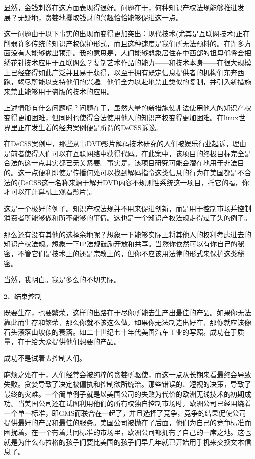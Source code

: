 显然，金钱刺激在这方面表现得很好。问题在于，何种知识产权法规能够推进发展？无疑地，贪婪地攫取钱财的兴趣恰恰能够促进这一点。

这一问题由于以下事实的出现而变得更加突出：现代技术(尤其是互联网技术)正在削弱许多传统的知识产权保护形式，而且这种速度是我们所无法预料的。在许多方面没有人能够做出预测。我的意思是，人们能够想象居住在中西部的祖母们将会把绣花针技术应用于互联网么？复制艺术作品的能力——和技术本身——在很大规模上已经变得如此广泛并且易于获得，以至于拥有既定信息提供者的机构们东奔西跑，竭尽所能以支持他们的兴趣。他们全力以赴地禁止类似的复制，并引入新措施来禁止能够用于盗版的技术的应用。

上述情形有什么问题呢？问题在于，虽然大量的新措施使非法使用他人的知识产权变得更加困难，但同时也使得合法使用他人的知识产权变得更加困难。在linux世界里正在发生着的经典案例便是所谓的DeCSS诉讼。

在DeCSS案例中，那些从事DVD影片解码技术研究的人们被娱乐行业起诉，理由是前者使得人们可以在互联网络中获得代码。在此案中，该项目的终极目标完全是合法的这一点其实都已无关紧要。事实是，该项目研究可能会潜在地用于非法目的。这一点便利即使是传播何处可以找到解码指令这类信息的行为在美国都是不合法的(DeCSS这一名称来源于解开DVD内容不规则性系统这一项目，托它的福，你才可以在计算机上观看影片)。

这是一个极好的例子。知识产权法规并不用来促进创新，而是用于控制市场并控制消费者所能够做和所不能够的事情。这也是一个知识产权法规走得过了头的例子。

那么还有没有其他的选择余地呢？想象一下能够实际上将其他人的权利考虑进去的知识产权法规。想象一下IP法规鼓励开放和共享。当然你依然可以有你自己的秘密，不管它们是技术上的还是宗教上的，但你不应该用法律的形式来保护这类秘密。

当然，我明白。我是多么的不切实际。

 
2、结束控制

既要生存，也要繁荣，这样的出路在于尽你所能去生产出最佳的产品。如果你无法靠此而生存和繁荣，那么你就不该这么做。如果你无法制造出好车，那你就应该像石头滚落山坡似的衰落。如二十世纪七十年代美国汽车工业的写照。成功在于质量，在于给大众提供他们想要的产品。

成功不是试着去控制人们。

麻烦之处在于，人们经常会被纯粹的贪婪所驱使，而这一点从长期来看最终会导致失败。贪婪导致了决定被偏执和控制欲所统治。那些错误的、短视的决策，导致了最终的灾难。一个简单例子就是以美国公司的失败为代价的欧洲无线技术的初期成功。当美国公司还在试图利用他们的所有权独自控制市场时，欧洲公司已经围绕着一个单一标准，即GMS而联合在一起了，并且选择了竞争。竞争的结果促使公司提供最好的产品和最佳的服务。美国公司被抛在了后面，他们为自己的竞争标准而困扰着。在一个有着共同标准的市场里，欧洲公司都拥有了自己的一席之地。这也就是为什么布拉格的孩子们要比美国的孩子们早几年就已开始用手机来交换文本信息了。

